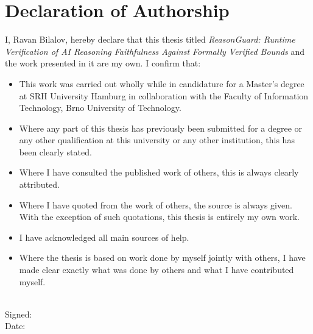 \chapter*{Declaration of Authorship}

I, Ravan Bilalov, hereby declare that this thesis titled \emph{ReasonGuard: Runtime
Verification of AI Reasoning Faithfulness Against Formally Verified Bounds} and the
work presented in it are my own. I confirm that:

\begin{itemize}
  \item This work was carried out wholly while in candidature for a Master's degree at
        SRH University Hamburg in collaboration with the Faculty of Information
        Technology, Brno University of Technology.
  \item Where any part of this thesis has previously been submitted for a degree or any
        other qualification at this university or any other institution, this has been
        clearly stated.
  \item Where I have consulted the published work of others, this is always clearly
        attributed.
  \item Where I have quoted from the work of others, the source is always given. With
        the exception of such quotations, this thesis is entirely my own work.
  \item I have acknowledged all main sources of help.
  \item Where the thesis is based on work done by myself jointly with others, I have
        made clear exactly what was done by others and what I have contributed myself.
\end{itemize}

\noindent\hspace*{1cm}\\
Signed: \hrulefill \\[0.4cm]
Date: \hrulefill
